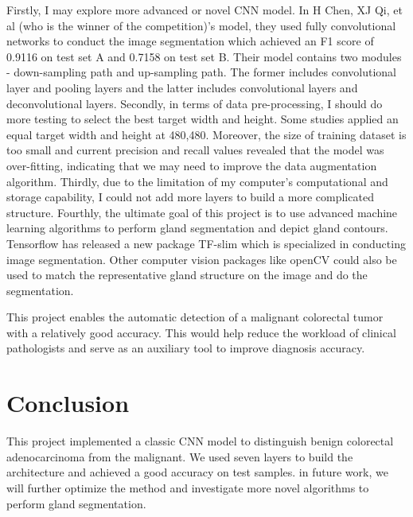 \documentclass[twoside,11pt]{article}
\begin{document}
Firstly, I may explore more advanced or novel CNN model. In H Chen, XJ Qi, et al \citep{9} (who is the winner of the competition)'s model, they used fully convolutional networks to conduct the image segmentation which achieved an F1 score of 0.9116 on test set A and 0.7158 on test set B. Their model contains two modules - down-sampling path and up-sampling path. The former includes convolutional layer and pooling layers and the latter includes convolutional layers and deconvolutional layers. 
Secondly, in terms of data pre-processing, I should do more testing to select the best target width and height. Some studies applied an equal target width and height at 480,480. Moreover, the size of training dataset is too small and current precision and recall values revealed that the model was over-fitting, indicating that we may need to improve the data augmentation algorithm. 
Thirdly, due to the limitation of my computer's computational and storage capability, I could not add more layers to build a more complicated structure. Fourthly, the ultimate goal of this project is to use advanced machine learning algorithms to perform gland segmentation and depict gland contours. Tensorflow has released a new package TF-slim which is specialized in conducting image segmentation. Other computer vision packages like openCV could also be used to match the representative gland structure on the image and do the segmentation.  

This project enables the automatic detection of a malignant colorectal tumor with a relatively good accuracy. This would help reduce the workload of clinical pathologists and serve as an auxiliary tool to improve diagnosis accuracy. 

\section{Conclusion} 
This project implemented a classic CNN model to distinguish benign colorectal adenocarcinoma from the malignant. We used seven layers to build the architecture and achieved a good accuracy on test samples. in future work, we will further optimize the method and investigate more novel algorithms to perform gland segmentation. 




\newpage
\appendix
\end{document}
